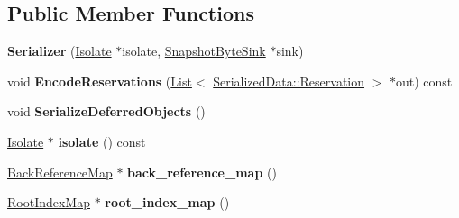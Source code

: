 \subsection*{Public Member Functions}
\begin{DoxyCompactItemize}
\item 
{\bfseries Serializer} (\hyperlink{classv8_1_1internal_1_1_isolate}{Isolate} $\ast$isolate, \hyperlink{classv8_1_1internal_1_1_snapshot_byte_sink}{Snapshot\+Byte\+Sink} $\ast$sink)\hypertarget{classv8_1_1internal_1_1_serializer_aaceee205adfe86e70640d2d50ad852c8}{}\label{classv8_1_1internal_1_1_serializer_aaceee205adfe86e70640d2d50ad852c8}

\item 
void {\bfseries Encode\+Reservations} (\hyperlink{classv8_1_1internal_1_1_list}{List}$<$ \hyperlink{classv8_1_1internal_1_1_serialized_data_1_1_reservation}{Serialized\+Data\+::\+Reservation} $>$ $\ast$out) const \hypertarget{classv8_1_1internal_1_1_serializer_a4369f3c382f047e42d25a16b17bce639}{}\label{classv8_1_1internal_1_1_serializer_a4369f3c382f047e42d25a16b17bce639}

\item 
void {\bfseries Serialize\+Deferred\+Objects} ()\hypertarget{classv8_1_1internal_1_1_serializer_a96ef0df54684240f4839fc03c1e6717c}{}\label{classv8_1_1internal_1_1_serializer_a96ef0df54684240f4839fc03c1e6717c}

\item 
\hyperlink{classv8_1_1internal_1_1_isolate}{Isolate} $\ast$ {\bfseries isolate} () const \hypertarget{classv8_1_1internal_1_1_serializer_a2b71e58ac55ccc7036d536a910b4623e}{}\label{classv8_1_1internal_1_1_serializer_a2b71e58ac55ccc7036d536a910b4623e}

\item 
\hyperlink{classv8_1_1internal_1_1_back_reference_map}{Back\+Reference\+Map} $\ast$ {\bfseries back\+\_\+reference\+\_\+map} ()\hypertarget{classv8_1_1internal_1_1_serializer_a6634b86a4bf872bdd1f3fc01e55de6dd}{}\label{classv8_1_1internal_1_1_serializer_a6634b86a4bf872bdd1f3fc01e55de6dd}

\item 
\hyperlink{classv8_1_1internal_1_1_root_index_map}{Root\+Index\+Map} $\ast$ {\bfseries root\+\_\+index\+\_\+map} ()\hypertarget{classv8_1_1internal_1_1_serializer_a011a1b048b43466869828f1efd61b6a3}{}\label{classv8_1_1internal_1_1_serializer_a011a1b048b43466869828f1efd61b6a3}

\end{DoxyCompactItemize}
